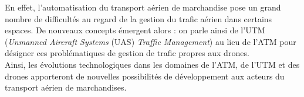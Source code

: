 En effet, l'automatisation du transport aérien de marchandise pose un grand nombre de difficultés au regard de la gestion du trafic aérien dans certains espaces. De nouveaux concepts émergent alors : on parle ainsi de l'UTM (\textit{Unmanned Aircraft Systems} (UAS) \textit{Traffic Management}) au lieu de l'ATM pour désigner ces problématiques de gestion de trafic propres aux drones.\\ 

Ainsi, les évolutions technologiques dans les domaines de l'ATM, de l'UTM et des drones apporteront de nouvelles possibilités de développement aux acteurs du transport aérien de marchandises.





